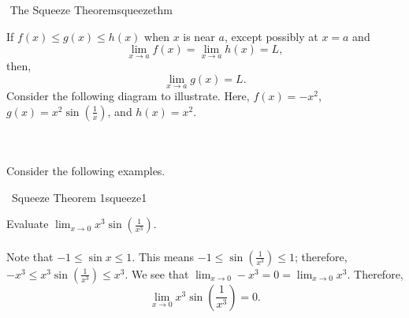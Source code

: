         \begin{theorem}{\Stop\,\,The Squeeze Theorem}{squeezethm}

            If \(f(x)\leq g(x)\leq h(x)\) when \(x\) is near \(a\), except possibly at \(x=a\) and
            \begin{equation*}
                \lim_{x\to a}f(x)=\lim_{x\to a}h(x)=L,
            \end{equation*}
            then,
            \begin{equation*}
                \lim_{x\to a}g(x)=L.
            \end{equation*}
            Consider the following diagram to illustrate. Here, \(f(x)=-x^2\), \(g(x)=x^2\sin\left(\frac{1}{x}\right)\), and \(h(x)=x^2\).
            \begin{center}
            \end{center}
            
        \end{theorem}
        \vphantom
        \\
        \\
        Consider the following examples.
        \begin{example}{\Difficulty\,\Difficulty\,\,Squeeze Theorem 1}{squeeze1}

           Evaluate \(\lim_{x\to 0}x^3\sin\left(\frac{1}{x^3}\right)\).
           \\
           \\
           Note that \(-1\leq \sin x\leq 1\). This means \(-1\leq \sin\left(\frac{1}{x^3}\right)\leq 1\); therefore, \(-x^3\leq x^3\sin\left(\frac{1}{x^3}\right)\leq x^3\). We see that \(\lim_{x\to 0}-x^3=0=\lim_{x\to 0}x^3\). Therefore,
           \begin{equation*}
                \lim_{x\to 0}x^3\sin\left(\frac{1}{x^3}\right)=0.
           \end{equation*}
            
        \end{example}
